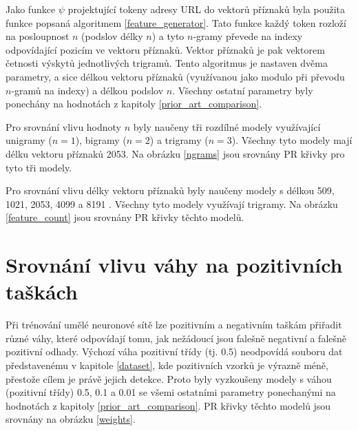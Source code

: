 Jako funkce \( \psi \) projektující tokeny adresy URL do vektorů příznaků byla použita funkce popsaná algoritmem \ref{feature_generator}. Tato funkce každý token rozloží na posloupnost \( n \) (podslov délky \( n \)) a tyto \( n \)-gramy převede na indexy odpovídající pozicím ve vektoru příznaků. Vektor příznaků je pak vektorem četnosti výskytů jednotlivých trigramů. Tento algoritmus je nastaven dvěma parametry, a sice délkou vektoru příznaků (využívanou jako modulo při převodu \( n \)-gramů na indexy) a délkou podslov \( n \). Všechny ostatní parametry byly ponechány na hodnotách z kapitoly \ref{prior_art_comparison}.

Pro srovnání vlivu hodnoty \( n \) byly naučeny tři rozdílné modely využívající unigramy (\( n = 1 \)), bigramy (\( n = 2 \))  a trigramy (\( n = 3 \)). Všechny tyto modely mají délku vektoru příznaků 2053. Na obrázku \ref{ngrams} jsou srovnány PR křivky pro tyto tři modely.


Pro srovnání vlivu délky vektoru příznaků byly naučeny modely s délkou 509, 1021, 2053, 4099 a 8191 . Všechny tyto modely využívají trigramy. Na obrázku \ref{feature_count} jsou srovnány PR křivky těchto modelů.


\section{Srovnání vlivu váhy na pozitivních taškách}
Při trénování umělé neuronové sítě lze pozitivním a negativním taškám přiřadit různé váhy, které odpovídají tomu, jak nežádoucí jsou falešně negativní a falešně pozitivní odhady. Výchozí váha pozitivní třídy (tj. 0.5) neodpovídá souboru dat představenému v kapitole \ref{dataset}, kde pozitivních vzorků je výrazně méně, přestože cílem je právě jejich detekce. Proto byly vyzkoušeny modely s váhou (pozitivní třídy) 0.5, 0.1 a 0.01 se všemi ostatními parametry ponechanými na hodnotách z kapitoly \ref{prior_art_comparison}. PR křivky těchto modelů jsou srovnány na obrázku \ref{weights}.

